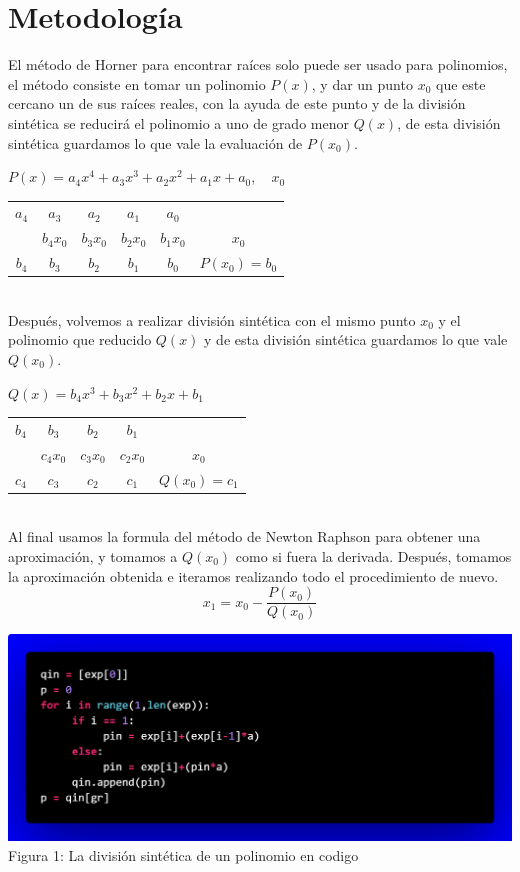 \documentclass[12pt]{article}
\begin{document}
		\section*{\centering Metodología}\label{sec:Metodologia}
			El método de Horner para encontrar raíces solo puede ser usado para polinomios, el método 
			consiste en tomar un polinomio $P(x) $, y dar un punto $ x_0 $ que este cercano un de sus 
			raíces reales, con la ayuda de este punto y de la división sintética se reducirá el polinomio 
			a uno de grado menor $ Q(x) $, de esta división sintética guardamos lo que vale la evaluación 
			de $ P(x_0) $.
			\begin{table}[h!]
				\centering
				$ P(x) = a_4x^4 + a_3x^3 + a_2x^2 + a_1x + a_0,\quad x_0 $ \\
				\begin{tabular}{ccccc|c}\\
					$a_4$ & $a_3$ & $a_2$ & $a_1$ & $a_0$ & \\
					 & $b_4x_0$ & $b_3x_0$ & $b_2x_0$ & $b_1x_0$ & $x_0$ \\\hline							
					$b_4$ & $b_3$ & $b_2$ & $b_1$ & $b_0$ & $ P(x_0) = b_0$ \\
				\end{tabular}
			\end{table}\\
			Después, volvemos a realizar división sintética con el mismo punto $ x_0 $ y el polinomio que 
			reducido $ Q(x) $ y de esta división sintética guardamos lo que vale $ Q(x_0) $.\\
			\begin{table}[h!]
				\centering
				$ Q(x) = b_4x^3 + b_3x^2 + b_2x + b_1 $ \\
				\begin{tabular}{cccc|c}\\
					$b_4$ & $b_3$ & $b_2$ & $b_1$ & \\
					 & $c_4x_0$ & $c_3x_0$ & $c_2x_0$ & $x_0$ \\\hline							
					$c_4$ & $c_3$ & $c_2$ & $c_1$ & $ Q(x_0) = c_1$ \\
				\end{tabular}
			\end{table}\\
			Al final usamos la formula del método de Newton Raphson para obtener una aproximación, y tomamos 
			a $ Q(x_0) $ como si fuera la derivada. Después, tomamos la aproximación obtenida e iteramos 
			realizando todo el procedimiento de nuevo.
			$$ x_1 = x_0 - \frac{P(x_0)}{Q(x_0)} $$
			\begin{center}
				\includegraphics[width=\linewidth]{Figura 1.png}
				Figura 1: La división sintética de un polinomio en codigo			
			\end{center}
\end{document}
